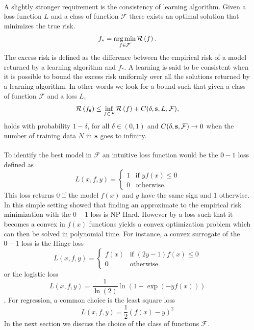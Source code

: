 \paragraph{}
A slightly stronger requirement is the consistency of learning algorithm.
Given a loss function $L$ and a class of function $\mathcal{F}$ there exists an
optimal solution that minimizes the true risk.
\begin{dmath*}
    f_* = \argmin_{f\in\mathcal{F}} \risk{f}.
\end{dmath*}
The excess risk is defined as the difference between the empirical risk of a
model returned by a learning algorithm and $f_*$. A learning is said to be
consistent when it is possible to bound the excess risk uniformly over all
the solutions returned by a learning algorithm. In other words we look for a
bound such that given a class of function $\mathcal{F}$ and a loss $L$,
\begin{dmath*}
    \risk{f_{\seq{s}}} \le \inf_{f\in\mathcal{F}} \risk{f} + C(\delta, \seq{s},
    L, \mathcal{F}),
\end{dmath*}
holds with probability $1 - \delta$, for all $\delta \in (0, 1)$  and
$C(\delta, \boldsymbol{\mathbf{s}}, \mathcal{F}) \to 0$ when the number of training data $N$ in
$\boldsymbol{\mathbf{s}}$ goes to infinity. 
\paragraph{}
To identify the best model in $\mathcal{F}$ an intuitive loss function would be
the $0-1$ loss defined as
\begin{dmath*}
    L(x, f, y) =
    \begin{cases}
        1 & \text{if } yf(x) \le 0 \\
        0 & \text{otherwise}.
    \end{cases}
\end{dmath*}
This loss returns $0$ if the model $f(x)$ and $y$ have the same sign and $1$
otherwise. In this simple setting \citet{hoffgen1995robust} showed that finding
an approximate to the empirical risk minimization with the $0-1$ loss is
NP-Hard. However by  a loss such that it becomes a convex in
$f(x)$ functions yields a convex optimization problem which can then be solved
in polynomial time. For instance, a convex surrogate of the $0-1$ loss is the
Hinge loss
\begin{dmath*}
    L(x, f, y) =
    \begin{cases}
        f(x) & \text{if } (2y-1)f(x) \le 0 \\
        0 & \text{otherwise}.
    \end{cases}
\end{dmath*}
or the logistic loss
\begin{dmath*}
    L(x, f, y) = \frac{1}{\ln(2)} \ln(1 + \exp(-yf(x)))
\end{dmath*}.
For regression, a common choice is the least square loss
\begin{dmath*}
    L(x, f, y) = \frac{1}{2}(f(x) - y)^2
\end{dmath*}
In the next section we discuss the choice of the class of functions
$\mathcal{F}$.

